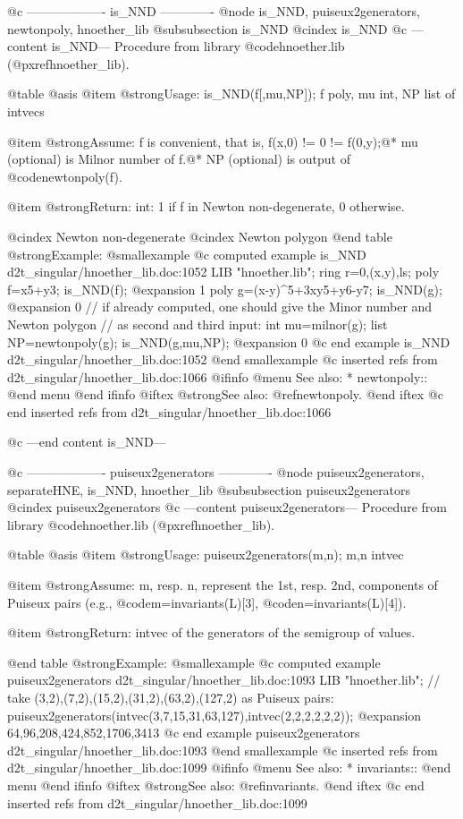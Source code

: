 @c ------------------- is_NND -------------
@node is_NND, puiseux2generators, newtonpoly, hnoether_lib
@subsubsection is_NND
@cindex is_NND
@c ---content is_NND---
Procedure from library @code{hnoether.lib} (@pxref{hnoether_lib}).

@table @asis
@item @strong{Usage:}
is_NND(f[,mu,NP]); f poly, mu int, NP list of intvecs

@item @strong{Assume:}
f is convenient, that is, f(x,0) != 0 != f(0,y);@*
mu (optional) is Milnor number of f.@*
NP (optional) is output of @code{newtonpoly(f)}.

@item @strong{Return:}
int: 1 if f in Newton non-degenerate, 0 otherwise.

@cindex Newton non-degenerate
@cindex Newton polygon
@end table
@strong{Example:}
@smallexample
@c computed example is_NND d2t_singular/hnoether_lib.doc:1052 
LIB "hnoether.lib";
ring r=0,(x,y),ls;
poly f=x5+y3;
is_NND(f);
@expansion{} 1
poly g=(x-y)^5+3xy5+y6-y7;
is_NND(g);
@expansion{} 0
// if already computed, one should give the Minor number and Newton polygon
// as second and third input: 
int mu=milnor(g);
list NP=newtonpoly(g);
is_NND(g,mu,NP);
@expansion{} 0
@c end example is_NND d2t_singular/hnoether_lib.doc:1052
@end smallexample
@c inserted refs from d2t_singular/hnoether_lib.doc:1066
@ifinfo
@menu
See also:
* newtonpoly::
@end menu
@end ifinfo
@iftex
@strong{See also:}
@ref{newtonpoly}.
@end iftex
@c end inserted refs from d2t_singular/hnoether_lib.doc:1066

@c ---end content is_NND---

@c ------------------- puiseux2generators -------------
@node puiseux2generators, separateHNE, is_NND, hnoether_lib
@subsubsection puiseux2generators
@cindex puiseux2generators
@c ---content puiseux2generators---
Procedure from library @code{hnoether.lib} (@pxref{hnoether_lib}).

@table @asis
@item @strong{Usage:}
puiseux2generators(m,n); m,n intvec

@item @strong{Assume:}
m, resp. n, represent the 1st, resp. 2nd, components of Puiseux pairs
(e.g., @code{m=invariants(L)[3]}, @code{n=invariants(L)[4]}).

@item @strong{Return:}
intvec of the generators of the semigroup of values.

@end table
@strong{Example:}
@smallexample
@c computed example puiseux2generators d2t_singular/hnoether_lib.doc:1093 
LIB "hnoether.lib";
// take (3,2),(7,2),(15,2),(31,2),(63,2),(127,2) as Puiseux pairs:
puiseux2generators(intvec(3,7,15,31,63,127),intvec(2,2,2,2,2,2));
@expansion{} 64,96,208,424,852,1706,3413
@c end example puiseux2generators d2t_singular/hnoether_lib.doc:1093
@end smallexample
@c inserted refs from d2t_singular/hnoether_lib.doc:1099
@ifinfo
@menu
See also:
* invariants::
@end menu
@end ifinfo
@iftex
@strong{See also:}
@ref{invariants}.
@end iftex
@c end inserted refs from d2t_singular/hnoether_lib.doc:1099


